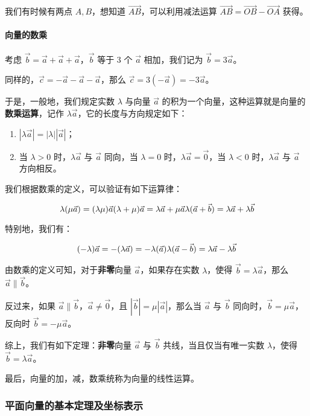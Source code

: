 我们有时候有两点 $A,B$，想知道 $\vec{AB}$，可以利用减法运算 $\vec{AB}=\vec{OB}-\vec{OA}$ 获得。

\paragraph{向量的数乘}

考虑 $\vec b=\vec a+\vec a+\vec a$，$\vec b$ 等于 3 个 $\vec a$ 相加，我们记为 $\vec b=3\vec a$。

同样的，$\vec c=-\vec a-\vec a-\vec a$，那么 $\vec c=3(-\vec a)=-3\vec a$。

于是，一般地，我们规定实数 $\lambda$ 与向量 $\vec a$ 的积为一个向量，这种运算就是向量的\textbf{数乘运算}，记作 $\lambda \vec a$，它的长度与方向规定如下：

\begin{enumerate}
\item $|\lambda \vec a|=|\lambda||\vec a|$；
\item 当 $\lambda >0$ 时，$\lambda\vec a$ 与 $\vec a$ 同向，当 $\lambda =0$ 时，$\lambda \vec a=\vec 0$，当 $\lambda<0$ 时，$\lambda \vec a$ 与 $\vec a$ 方向相反。
\end{enumerate}

我们根据数乘的定义，可以验证有如下运算律：

$$
\lambda(\mu \vec a)=(\lambda \mu)\vec a\\
(\lambda+\mu)\vec a=\lambda \vec a+\mu \vec a\\
\lambda(\vec a+\vec b)=\lambda \vec a+\lambda \vec b
$$

特别地，我们有：

$$
(-\lambda)\vec a=-(\lambda \vec a)=-\lambda(\vec a)\\
\lambda(\vec a-\vec b)=\lambda \vec a-\lambda \vec b
$$

由数乘的定义可知，对于\textbf{非零}向量 $\vec a$，如果存在实数 $\lambda$，使得 $\vec b=\lambda \vec a$，那么 $\vec a \parallel \vec b$。

反过来，如果 $\vec a\parallel \vec b$，$\vec a \not = \vec 0$，且 $|\vec b|=\mu |\vec a|$，那么当 $\vec a$ 与 $\vec b$ 同向时，$\vec b=\mu \vec a$，反向时 $\vec b=-\mu \vec a$。

综上，我们有如下定理：\textbf{非零}向量 $\vec a$ 与 $\vec b$ 共线，当且仅当有唯一实数 $\lambda$，使得 $\vec b=\lambda \vec a$。

最后，向量的加，减，数乘统称为向量的线性运算。

\subsubsection{平面向量的基本定理及坐标表示}

